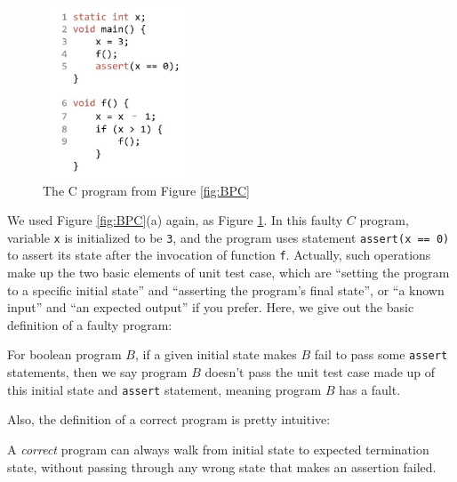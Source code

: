 \begin{figure}
\centering
\includegraphics[width=1.7in,height=2in]{img/Fig3-1.jpg}
\caption{The C program from Figure \ref{fig:BPC}}
\label{fig:FC}
\end{figure}

We used Figure \ref{fig:BPC}(a) again, as Figure \ref{fig:FC}. In this faulty $C$ program, variable \lstinline|x| is initialized to be \lstinline|3|, and the program uses statement \lstinline|assert(x == 0)| to assert its state after the invocation of function \lstinline|f|.
Actually, such operations make up the two basic elements of unit test case, which are ``setting the program to a specific initial state'' and ``asserting the program's final state'', or ``a known input'' and ``an expected output'' if you prefer.
Here, we give out the basic definition of a faulty program:

\begin{definition}
\label{definition:FaultyProgram}
For boolean program $B$, if a given initial state makes $B$ fail to pass some \lstinline|assert| statements, then we say program $B$ doesn't pass the unit test case made up of this initial state and \lstinline|assert| statement,
meaning program $B$ has a fault.
\end{definition}

Also, the definition of a correct program is pretty intuitive:

\begin{definition}
\label{definition:CorrectProgram}
A {\it correct} program can always walk from initial state to expected termination state, without passing through any wrong state that makes an assertion failed.
\end{definition}

